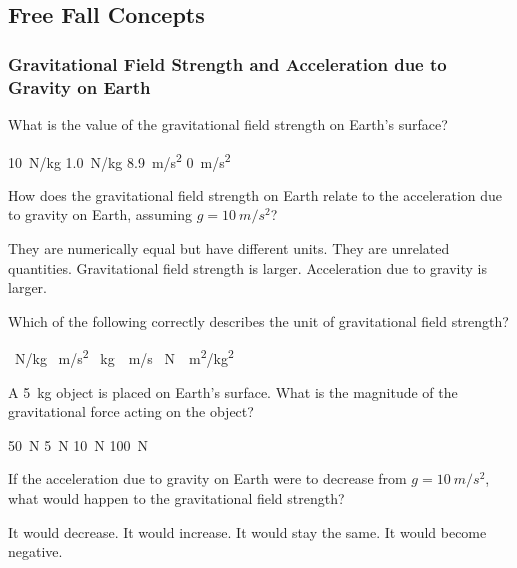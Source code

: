 \documentclass[]{exam}
\theoremstyle{definition}
\begin{document}
\clearpage


\subsection*{Free Fall Concepts}

\subsubsection*{Gravitational Field Strength and Acceleration due to Gravity on Earth}



\begin{questions}

\question  
What is the value of the gravitational field strength on Earth's surface?  
\begin{randomizechoices}  
    \correctchoice \SI{10}{N/kg}  
    \choice \SI{1.0}{N/kg}  
    \choice \SI{8.9}{m/s^2}  
    \choice \SI{0}{m/s^2}  
\end{randomizechoices}  



\question  
How does the gravitational field strength on Earth relate to the acceleration due to gravity on Earth, assuming \( g = \SI{10}{m/s^2} \)?  

\begin{randomizechoices}  
    \correctchoice They are numerically equal but have different units.  
    \choice They are unrelated quantities.  
    \choice Gravitational field strength is larger.  
    \choice Acceleration due to gravity is larger.  
\end{randomizechoices}  



\question  
Which of the following correctly describes the unit of gravitational field strength?  

\begin{randomizechoices}  
    \correctchoice \SI{}{N/kg}  
    \choice \SI{}{m/s^2}  
    \choice \SI{}{kg \cdot m/s}  
    \choice \SI{}{N \cdot m^2/kg^2}  
\end{randomizechoices}  


\question 

A \SI{5}{kg} object is placed on Earth's surface. What is the magnitude of the gravitational force acting on the object?  
\begin{randomizechoices}  
    \correctchoice \SI{50}{N}  
    \choice \SI{5}{N}  
    \choice \SI{10}{N}  
    \choice \SI{100}{N}  
\end{randomizechoices}  



\question  
If the acceleration due to gravity on Earth were to decrease from \( g = \SI{10}{m/s^2} \), what would happen to the gravitational field strength?  

\begin{randomizechoices}  
    \correctchoice It would decrease.  
    \choice It would increase.  
    \choice It would stay the same.  
    \choice It would become negative.  
\end{randomizechoices}  
\end{questions}
\end{document}
